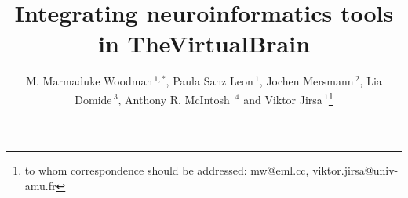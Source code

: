 \documentclass{bioinfo}
\begin{document}

\title[TVB]{Integrating neuroinformatics tools in TheVirtualBrain}
\author[Sanz Leon {et~al}]{
        M. Marmaduke Woodman\,$^{1,*}$,  
        Paula Sanz Leon\,$^{1}$, 
        Jochen Mersmann\,$^{2}$,
        Lia Domide\,$^{3}$, 
        Anthony R. McIntosh \,$^{4}$ and  
        Viktor Jirsa\,$^{1}$\footnote{to whom correspondence should be addressed: mw@eml.cc,
        viktor.jirsa@univ-amu.fr}}

\address{$^{1}$ Institut de Neurosciences des Syst{\`e}mes, 27, Bd. Jean Moulin, 13005, Marseille, France.\\
         $^{3}$ Codemart, 13, Petofi Sandor, 400610, Cluj-Napoca, Romania.\\
         $^{2}$ CodeBox GmbH, Hugo Eckener Str. 7, 70184 Stuttgart, Germany.\\
         $^{4}$ Rotman Research Institute at Baycrest, Toronto, M6A 2E1, Ontario, Canada\\
        }

\history{}

\editor{}

\maketitle

\end{document}
